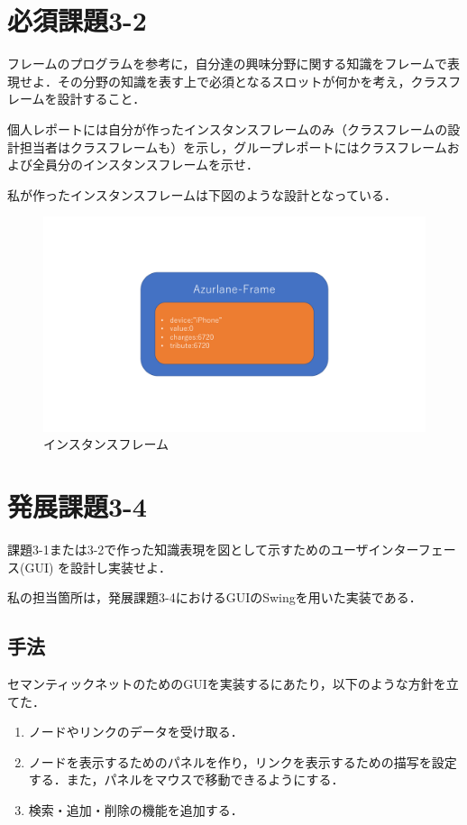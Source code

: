 \documentclass[12pt]{jarticle}
\begin{document}
\section{必須課題3-2}
\begin{screen}
フレームのプログラムを参考に，自分達の興味分野に関する知識をフレームで表現せよ．その分野の知識を表す上で必須となるスロットが何かを考え，クラスフレームを設計すること．

個人レポートには自分が作ったインスタンスフレームのみ（クラスフレームの設計担当者はクラスフレームも）を示し，グループレポートにはクラスフレームおよび全員分のインスタンスフレームを示せ．
\end{screen}
私が作ったインスタンスフレームは下図のような設計となっている．
\begin{figure}[!hbt]
  	\begin{center}
  		\includegraphics[scale=0.40]{images/azurlane.pdf}
	\end{center}
  	\caption{インスタンスフレーム}
\end{figure}

\clearpage

\section{発展課題3-4}
\begin{screen}
課題3-1または3-2で作った知識表現を図として示すためのユーザインターフェース(GUI) を設計し実装せよ．
\end{screen}
私の担当箇所は，発展課題3-4におけるGUIのSwingを用いた実装である．

\subsection{手法}
セマンティックネットのためのGUIを実装するにあたり，以下のような方針を立てた．
\begin{enumerate}
\item ノードやリンクのデータを受け取る．
\item ノードを表示するためのパネルを作り，リンクを表示するための描写を設定する．また，パネルをマウスで移動できるようにする．
\item 検索・追加・削除の機能を追加する．
\end{enumerate}
\end{document}
